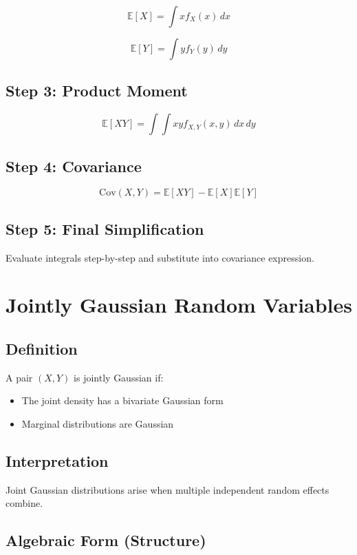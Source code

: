 \documentclass[12pt]{article}
\begin{document}
\[
\mathbb{E}[X] = \int x f_X(x)\,dx
\]

\[
\mathbb{E}[Y] = \int y f_Y(y)\,dy
\]

\subsection{Step 3: Product Moment}

\[
\mathbb{E}[XY] = \int \int xy f_{X,Y}(x,y)\,dx\,dy
\]

\subsection{Step 4: Covariance}

\[
\text{Cov}(X,Y) = \mathbb{E}[XY] - \mathbb{E}[X]\mathbb{E}[Y]
\]

\subsection{Step 5: Final Simplification}

Evaluate integrals step-by-step and substitute into covariance expression.

\section{Jointly Gaussian Random Variables}

\subsection{Definition}

A pair $(X,Y)$ is jointly Gaussian if:

\begin{itemize}
    \item The joint density has a bivariate Gaussian form
    \item Marginal distributions are Gaussian
\end{itemize}

\subsection{Interpretation}

Joint Gaussian distributions arise when multiple independent random effects combine.

\subsection{Algebraic Form (Structure)}
\end{document}

